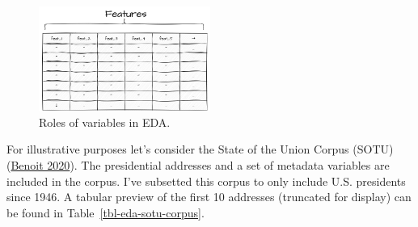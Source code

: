 \documentclass[
  letterpaper,
  DIV=11,
  numbers=noendperiod]{scrreport}
\theoremstyle{definition}
\theoremstyle{remark}
\begin{document}
\begin{figure}[H]

{\centering \includegraphics[width=0.5\textwidth,height=\textheight]{figures/approaching-analysis/aa-eda-variables.drawio.png}

}

\caption{\label{fig-eda-variables}Roles of variables in EDA.}

\end{figure}

For illustrative purposes let's consider the State of the Union Corpus
(SOTU) (\protect\hyperlink{ref-R-quanteda.corpora}{Benoit 2020}). The
presidential addresses and a set of metadata variables are included in
the corpus. I've subsetted this corpus to only include U.S. presidents
since 1946. A tabular preview of the first 10 addresses (truncated for
display) can be found in Table~\ref{tbl-eda-sotu-corpus}.
\end{document}
